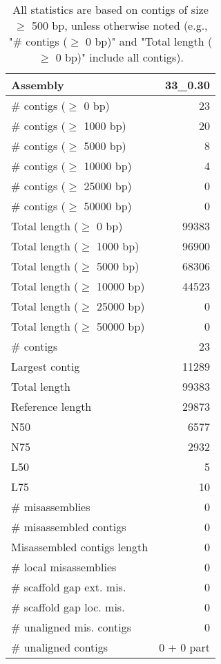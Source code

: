 \documentclass[12pt,a4paper]{article}
\begin{document}
\begin{table}[ht]
\begin{center}
\caption{All statistics are based on contigs of size $\geq$ 500 bp, unless otherwise noted (e.g., "\# contigs ($\geq$ 0 bp)" and "Total length ($\geq$ 0 bp)" include all contigs).}
\begin{tabular}{|l*{1}{|r}|}
\hline
Assembly & 33\_0.30 \\ \hline
\# contigs ($\geq$ 0 bp) & 23 \\ \hline
\# contigs ($\geq$ 1000 bp) & 20 \\ \hline
\# contigs ($\geq$ 5000 bp) & 8 \\ \hline
\# contigs ($\geq$ 10000 bp) & 4 \\ \hline
\# contigs ($\geq$ 25000 bp) & 0 \\ \hline
\# contigs ($\geq$ 50000 bp) & 0 \\ \hline
Total length ($\geq$ 0 bp) & 99383 \\ \hline
Total length ($\geq$ 1000 bp) & 96900 \\ \hline
Total length ($\geq$ 5000 bp) & 68306 \\ \hline
Total length ($\geq$ 10000 bp) & 44523 \\ \hline
Total length ($\geq$ 25000 bp) & 0 \\ \hline
Total length ($\geq$ 50000 bp) & 0 \\ \hline
\# contigs & 23 \\ \hline
Largest contig & 11289 \\ \hline
Total length & 99383 \\ \hline
Reference length & 29873 \\ \hline
N50 & 6577 \\ \hline
N75 & 2932 \\ \hline
L50 & 5 \\ \hline
L75 & 10 \\ \hline
\# misassemblies & 0 \\ \hline
\# misassembled contigs & 0 \\ \hline
Misassembled contigs length & 0 \\ \hline
\# local misassemblies & 0 \\ \hline
\# scaffold gap ext. mis. & 0 \\ \hline
\# scaffold gap loc. mis. & 0 \\ \hline
\# unaligned mis. contigs & 0 \\ \hline
\# unaligned contigs & 0 + 0 part \\ \hline

\end{tabular}
\end{center}
\end{table}
\end{document}
